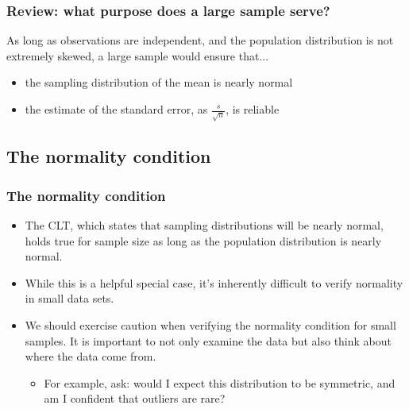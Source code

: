 \documentclass[slidestop,compress,mathserif]{beamer}
\begin{document}

\begin{frame}
\frametitle{Review: what purpose does a large sample serve?}

As long as observations are independent, and the population distribution is not extremely skewed, a large sample would ensure that...

\begin{itemize}

\item the sampling distribution of the mean is nearly normal

\item the estimate of the standard error, as $\frac{s}{\sqrt{n}}$, is reliable

\end{itemize}

\end{frame}


\subsection{The normality condition}


\begin{frame}
\frametitle{The normality condition}

\begin{itemize}

\item The CLT, which states that sampling distributions will be nearly normal, holds true for  sample size as long as the population distribution is nearly normal.

\pause

\item While this is a helpful special case, it's inherently difficult to verify normality in small data sets.

\pause

\item We should exercise caution when verifying the normality condition for small samples. It is important to not only examine the data but also think about where the data come from. 
\begin{itemize}
\item For example, ask: would I expect this distribution to be symmetric, and am I confident that outliers are rare?
\end{itemize}

\end{itemize}

\end{frame}
\end{document}

